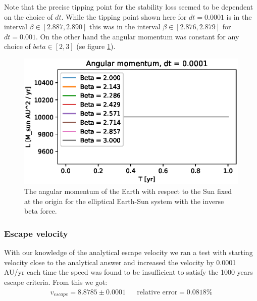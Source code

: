 \documentclass[american,a4paper,12pt]{article}
\begin{document}
Note that the precise tipping point for the stability loss seemed to be dependent on the choice of $dt$. While the tipping point shown here for $dt = 0.0001$ is in the interval $\beta \in [2.887, 2.890]$ this was in the interval $\beta \in [2.876, 2.879]$ for $dt = 0.001$. On the other hand the angular momentum was constant for any choice of $beta \in [2,3]$ (se figure \ref{fig:IB_L}).

\begin{figure}[H]
    \centering
    \includegraphics[width = \textwidth]{figures/EarthSun_InverseBeta_L.eps}
    \caption{The angular momentum of the Earth with respect to the Sun fixed at the origin for the elliptical Earth-Sun system with the inverse beta force.}
    \label{fig:IB_L}
\end{figure}


\subsubsection{Escape velocity}
With our knowledge of the analytical escape velocity we ran a test with starting velocity close to the analytical answer and increased the velocity by 0.0001 AU/yr each time the speed was found to be insufficient to satisfy the 1000 years escape criteria. From this we got: 
\begin{align*}
    &v_{escape} = 8.8785 \pm 0.0001& &\text{relative error} = 0.0818 \%& 
\end{align*}
\end{document}
